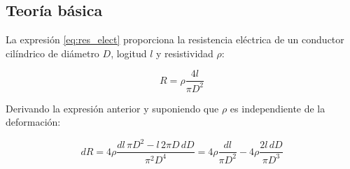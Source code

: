 









\subsection{Teoría básica}

La expresión \ref{eq:res_elect} proporciona la resistencia eléctrica de un conductor 
cilíndrico de diámetro $D$, logitud $l$ y resistividad $\rho$:

\begin{equation}\label{eq:res_elect}
R = \rho \frac{4l}{\pi D^2}
\end{equation}

Derivando la expresión anterior y suponiendo que $\rho$ es independiente de la deformación:

\begin{equation}\label{eq:xxx01}
dR = 4\rho \frac{dl\,\pi D^2 - l\,2\pi D \, dD}{\pi^2 D^4} = 
4\rho \frac{dl}{\pi D^2} - 4\rho \frac{2l\,dD}{\pi D^3}
\end{equation}

